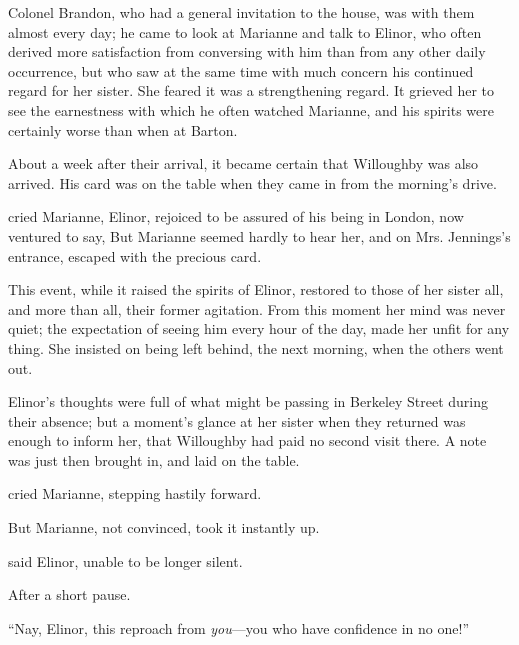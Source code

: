 Colonel Brandon, who had a general invitation to the house, was with them almost every day; he came to look at Marianne and talk to Elinor, who often derived more satisfaction from conversing with him than from any other daily occurrence, but who saw at the same time with much concern his continued regard for her sister. She feared it was a strengthening regard. It grieved her to see the earnestness with which he often watched Marianne, and his spirits were certainly worse than when at Barton.

About a week after their arrival, it became certain that Willoughby was also arrived. His card was on the table when they came in from the morning's drive.

 cried Marianne,  Elinor, rejoiced to be assured of his being in London, now ventured to say,  But Marianne seemed hardly to hear her, and on Mrs. Jennings's entrance, escaped with the precious card.

This event, while it raised the spirits of Elinor, restored to those of her sister all, and more than all, their former agitation. From this moment her mind was never quiet; the expectation of seeing him every hour of the day, made her unfit for any thing. She insisted on being left behind, the next morning, when the others went out.

Elinor's thoughts were full of what might be passing in Berkeley Street during their absence; but a moment's glance at her sister when they returned was enough to inform her, that Willoughby had paid no second visit there. A note was just then brought in, and laid on the table.

 cried Marianne, stepping hastily forward.


But Marianne, not convinced, took it instantly up.


 said Elinor, unable to be longer silent.


After a short pause. 

“Nay, Elinor, this reproach from {\em you}---you who have confidence in no one!”


